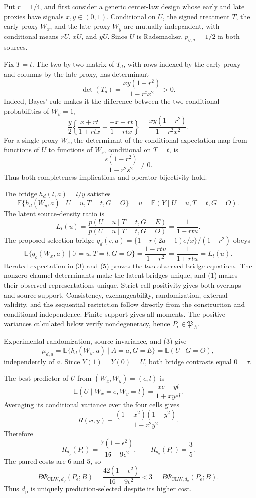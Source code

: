 Put \(r=1/4\), and first consider a generic center-law design whose early and late proxies have signals \(x,y\in(0,1)\). Conditional on \(U\), the signed treatment \(T\), the early proxy \(W_x\), and the late proxy \(W_y\) are mutually independent, with conditional means \(rU\), \(xU\), and \(yU\). Since \(U\) is Rademacher, \(p_{g,a}=1/2\) in both sources.

Fix \(T=t\). The two-by-two matrix of \(T_d\), with rows indexed by the early proxy and columns by the late proxy, has determinant
\[
\det(T_d)=\frac{xy(1-r^2)}{1-r^2x^2}>0. \tag{1}
\]
Indeed, Bayes' rule makes it the difference between the two conditional probabilities of \(W_y=1\),
\[
\frac y2\left\{\frac{x+rt}{1+rtx}-\frac{-x+rt}{1-rtx}\right\}
=\frac{xy(1-r^2)}{1-r^2x^2}.
\]
For a single proxy \(W_s\), the determinant of the conditional-expectation map from functions of \(U\) to functions of \(W_s\), conditional on \(T=t\), is
\[
\frac{s(1-r^2)}{1-r^2s^2}\ne0. \tag{2}
\]
Thus both completeness implications and operator bijectivity hold.

The bridge \(h_d(l,a)=l/y\) satisfies
\[
\mathbb E\{h_d(W_y,a)\mid U=u,T=t,G=O\}=u
=\mathbb E(Y\mid U=u,T=t,G=O). \tag{3}
\]
The latent source-density ratio is
\[
L_t(u)=\frac{p(U=u\mid T=t,G=E)}{p(U=u\mid T=t,G=O)}
=\frac1{1+rtu}. \tag{4}
\]
The proposed selection bridge \(q_d(e,a)=\{1-r(2a-1)e/x\}/(1-r^2)\) obeys
\[
\mathbb E\{q_d(W_x,a)\mid U=u,T=t,G=O\}
=\frac{1-rtu}{1-r^2}=\frac1{1+rtu}=L_t(u). \tag{5}
\]
Iterated expectation in (3) and (5) proves the two observed bridge equations. The nonzero channel determinants make the latent bridges unique, and (1) makes their observed representations unique. Strict cell positivity gives both overlaps and source support. Consistency, exchangeability, randomization, external validity, and the sequential restriction follow directly from the construction and conditional independence. Finite support gives all moments. The positive variances calculated below verify nondegeneracy, hence \(P_\epsilon\in\mathfrak P_{\mathcal D}\).

Experimental randomization, source invariance, and (3) give
\[
\mu_{d,a}=\mathbb E\{h_d(W_y,a)\mid A=a,G=E\}
=\mathbb E(U\mid G=O), \tag{6}
\]
independently of \(a\). Since \(Y(1)=Y(0)=U\), both bridge contrasts equal \(0=\tau\).

The best predictor of \(U\) from \((W_x,W_y)=(e,l)\) is
\[
\mathbb E(U\mid W_x=e,W_y=l)=\frac{xe+yl}{1+xyel}.
\]
Averaging its conditional variance over the four cells gives
\[
R(x,y)=\frac{(1-x^2)(1-y^2)}{1-x^2y^2}. \tag{7}
\]
Therefore
\[
R_{d_{\mathrm p}}(P_\epsilon)
=\frac{7(1-\epsilon^2)}{16-9\epsilon^2},
\qquad R_{d_{\mathrm e}}(P_\epsilon)=\frac35. \tag{8}
\]
The paired costs are \(6\) and \(5\), so
\[
B\Psi_{\mathrm{CLW},d_{\mathrm p}}(P_\epsilon;B)
=\frac{42(1-\epsilon^2)}{16-9\epsilon^2}
<3=B\Psi_{\mathrm{CLW},d_{\mathrm e}}(P_\epsilon;B). \tag{9}
\]
Thus \(d_{\mathrm p}\) is uniquely prediction-selected despite its higher cost.


